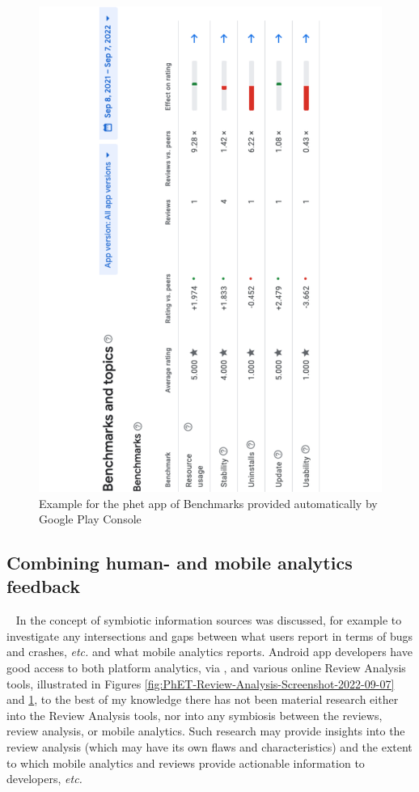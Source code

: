 \begin{figure}
    \centering
    \includegraphics[width=\linewidth]{images/google-play-console/PhET-Review-Benchmarks-Screenshot-2022-09-07.pdf}
    \caption{Example for the \Gls{phet} app of Benchmarks provided automatically by Google Play Console}
    \label{fig:PhET-Review-Benchmarks-Screenshot-2022-09-07}
\end{figure}

\subsection{Combining human- and mobile analytics feedback}~\label{fw-combining-reviews-and-mobile-analytics-topic}
In  the concept of symbiotic information sources was discussed, for example to investigate any intersections and gaps between what users report in terms of bugs and crashes, \emph{etc.} and what mobile analytics reports. Android app developers have good access to both platform analytics, via , and various online Review Analysis tools, illustrated in Figures \ref{fig:PhET-Review-Analysis-Screenshot-2022-09-07} and \ref{fig:PhET-Review-Benchmarks-Screenshot-2022-09-07}, to the best of my knowledge there has not been material research either into the Review Analysis tools, nor into any symbiosis between the reviews, review analysis, or mobile analytics. Such research may provide insights into the review analysis (which may have its own flaws and characteristics) and the extent to which mobile analytics and reviews provide actionable information to developers, \emph{etc.}


